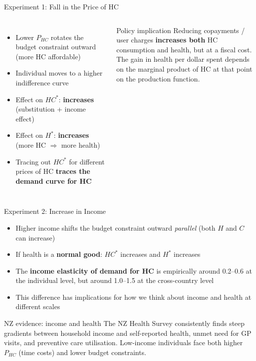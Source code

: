 \documentclass[aspectratio=169, 12pt]{beamer}
\begin{document}
\begin{frame}{Experiment 1: Fall in the Price of HC}
  \begin{columns}
      \begin{itemize}
        \item Lower $P_{HC}$ rotates the budget constraint outward (more HC affordable)
        \item Individual moves to a higher indifference curve
        \item Effect on \textbf{$HC^*$}: \textcolor{OtagoBlue}{\textbf{increases}} (substitution + income effect)
        \item Effect on \textbf{$H^*$}: \textcolor{OtagoBlue}{\textbf{increases}} (more HC $\Rightarrow$ more health)
        \item Tracing out $HC^*$ for different prices of HC \textbf{traces the demand curve for HC}
      \end{itemize}
      \begin{alertblock}{Policy implication}
        Reducing copayments / user charges \textbf{increases both} HC consumption and health,
        but at a fiscal cost.\\[0.3em]
        The gain in health per dollar spent depends on the marginal product of HC at that point
        on the production function.
      \end{alertblock}
  \end{columns}
\end{frame}

\begin{frame}{Experiment 2: Increase in Income}
  \begin{itemize}
    \item Higher income shifts the budget constraint outward \emph{parallel} (both $H$ and $C$
          can increase)
    \item If health is a \textbf{normal good}: $HC^*$ increases and $H^*$ increases
    \item The \textbf{income elasticity of demand for HC} is empirically around 0.2--0.6 at
          the individual level, but around 1.0--1.5 at the cross-country level
    \item This difference has implications for how we think about income and health at different
          scales
  \end{itemize}
  \begin{exampleblock}{NZ evidence: income and health}
    The NZ Health Survey consistently finds steep gradients between household income and
    self-reported health, unmet need for GP visits, and preventive care utilisation.
    Low-income individuals face both higher $P_{HC}$ (time costs) and lower budget constraints.
  \end{exampleblock}
\end{frame}
\end{document}
